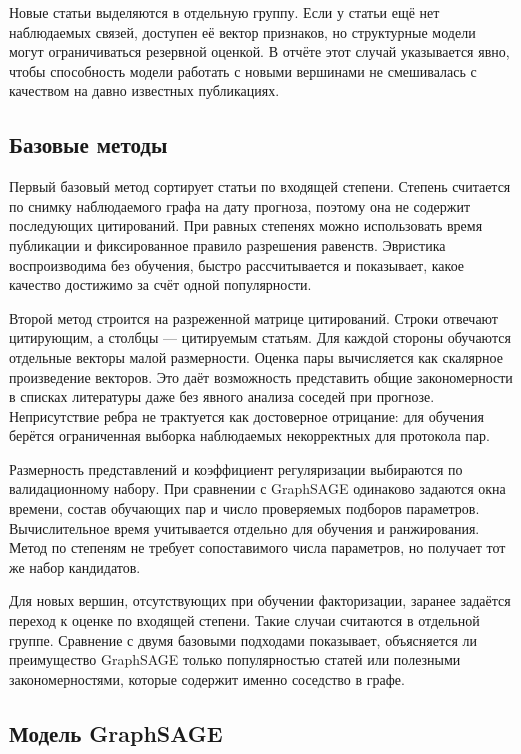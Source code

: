 \documentclass[a4paper,14pt,oneside]{extarticle}
\begin{document}
Новые статьи выделяются в отдельную группу. Если у статьи ещё нет наблюдаемых связей, доступен
её вектор признаков, но структурные модели могут ограничиваться резервной оценкой.
В отчёте этот случай указывается явно, чтобы способность модели работать с новыми вершинами
не смешивалась с качеством на давно известных публикациях.

\clearpage
\subsection{Базовые методы}

Первый базовый метод сортирует статьи по входящей степени. Степень считается по снимку
наблюдаемого графа на дату прогноза, поэтому она не содержит последующих цитирований.
При равных степенях можно использовать время публикации и фиксированное правило разрешения
равенств. Эвристика воспроизводима без обучения, быстро рассчитывается и показывает,
какое качество достижимо за счёт одной популярности.

Второй метод строится на разреженной матрице цитирований. Строки отвечают цитирующим,
а столбцы — цитируемым статьям. Для каждой стороны обучаются отдельные векторы
малой размерности. Оценка пары вычисляется как скалярное произведение векторов.
Это даёт возможность представить общие закономерности в списках литературы даже без явного
анализа соседей при прогнозе. Неприсутствие ребра не трактуется как достоверное отрицание:
для обучения берётся ограниченная выборка наблюдаемых некорректных для протокола пар.

Размерность представлений и коэффициент регуляризации выбираются по валидационному набору.
При сравнении с GraphSAGE одинаково задаются окна времени, состав обучающих пар и число
проверяемых подборов параметров. Вычислительное время учитывается отдельно для обучения
и ранжирования. Метод по степеням не требует сопоставимого числа параметров, но получает
тот же набор кандидатов.

Для новых вершин, отсутствующих при обучении факторизации, заранее задаётся переход к оценке
по входящей степени. Такие случаи считаются в отдельной группе. Сравнение с двумя базовыми
подходами показывает, объясняется ли преимущество GraphSAGE только популярностью статей
или полезными закономерностями, которые содержит именно соседство в графе.

\clearpage
\subsection{Модель GraphSAGE}
\end{document}
